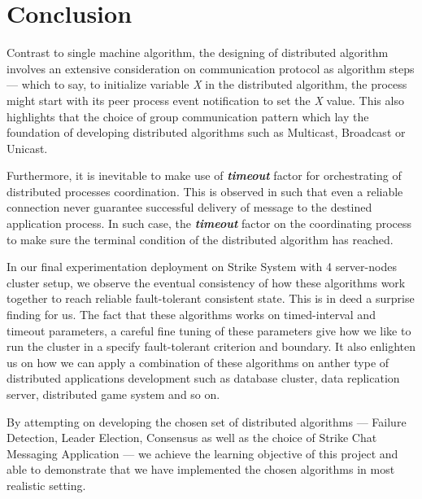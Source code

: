 \documentclass[dareport.tex]{subfiles}
\begin{document}
\section{Conclusion}

Contrast to single machine algorithm, the designing of distributed algorithm involves an extensive consideration on communication protocol as algorithm steps --- which to say, to initialize variable \emph{X} in the distributed algorithm, the process might start with its peer process event notification to set the \emph{X} value. This also highlights that the choice of group communication pattern which lay the foundation of developing distributed algorithms such as Multicast, Broadcast or Unicast.

Furthermore, it is inevitable to make use of \textbf{\emph{timeout}} factor for orchestrating of  distributed processes coordination. This is observed in such that even a reliable connection never guarantee successful delivery of message to the destined application process. In such case, the \textbf{\textit{timeout}} factor on the coordinating process to make sure the terminal condition of the distributed algorithm has reached.

In our final experimentation deployment on Strike System with 4 server-nodes cluster setup, we observe the eventual consistency of how these algorithms work together to reach reliable fault-tolerant consistent state. This is in deed a surprise finding for us. The fact that these algorithms works on timed-interval and timeout parameters, a careful fine tuning of these parameters give how we like to run the cluster in a specify fault-tolerant criterion and boundary. It also enlighten us on how we can apply a combination of these algorithms on anther type of distributed applications development such as database cluster, data replication server, distributed game system and so on.

By attempting on developing the chosen set of distributed algorithms --- Failure Detection, Leader Election, Consensus as well as the choice of Strike Chat Messaging Application --- we achieve the learning objective of this project and able to demonstrate that we have implemented the chosen algorithms in most realistic setting.
\end{document}
